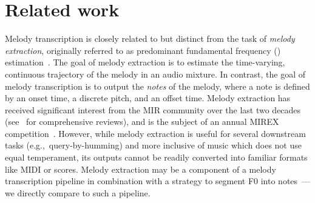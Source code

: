 \section{Related work}\label{sec:related}

Melody transcription is closely related to but distinct from the task of \emph{melody extraction}, originally referred to as predominant fundamental frequency (\fnot) estimation~\cite{goto1999real,goto2004real}. 
The goal of melody extraction is to estimate the time-varying, continuous \fnot{} trajectory of the melody in an audio mixture. 
In contrast, the goal of melody transcription is to output the \emph{notes} of the melody, where a note is defined by an onset time, a discrete pitch, and an offset time. 
Melody extraction has received significant interest from the MIR community over the last two decades (see~\cite{salamon2014melody,rao2022melody} for comprehensive reviews), 
and is the subject of an annual MIREX competition~\cite{downie2014ten}. 
However, 
while melody extraction is useful for several downstream tasks (e.g.,~query-by-humming) and more inclusive of music which does not use equal temperament, 
its outputs cannot be readily converted into familiar formats like MIDI or scores. 
Melody extraction may be a component of a melody transcription pipeline in combination with a strategy to segment F0 
into notes~\cite{salamon2015midi,nishikimi2016musical,nishikimi2017scale}---we directly compare to such a pipeline.

